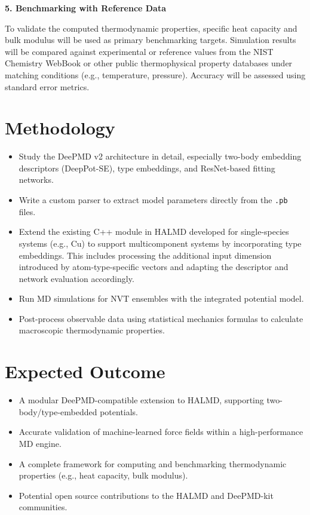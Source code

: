 \documentclass[12pt]{article}
\begin{document}
\textbf{5. Benchmarking with Reference Data}

To validate the computed thermodynamic properties, specific heat capacity and bulk modulus will be used as primary benchmarking targets. Simulation results will be compared against experimental or reference values from the NIST Chemistry WebBook or other public thermophysical property databases under matching conditions (e.g., temperature, pressure). Accuracy will be assessed using standard error metrics.

\section*{Methodology}
\begin{itemize}
    \item Study the DeePMD v2 architecture in detail, especially two-body embedding descriptors (DeepPot-SE), type embeddings, and ResNet-based fitting networks.
    \item Write a custom parser to extract model parameters directly from the \texttt{.pb} files.
    \item Extend the existing C++ module in HALMD developed for single-species systems (e.g., Cu) to support multicomponent systems by incorporating type embeddings. This includes processing the additional input dimension introduced by atom-type-specific vectors and adapting the descriptor and network evaluation accordingly.
    \item Run MD simulations for NVT ensembles with the integrated potential model.
    \item Post-process observable data using statistical mechanics formulas to calculate macroscopic thermodynamic properties.
\end{itemize}


\section*{Expected Outcome}
\begin{itemize}
    \item A modular DeePMD-compatible extension to HALMD, supporting two-body/type-embedded potentials.
    \item Accurate validation of machine-learned force fields within a high-performance MD engine.
    \item A complete framework for computing and benchmarking thermodynamic properties (e.g., heat capacity, bulk modulus).
    \item Potential open source contributions to the HALMD and DeePMD-kit communities.
\end{itemize}
\end{document}
